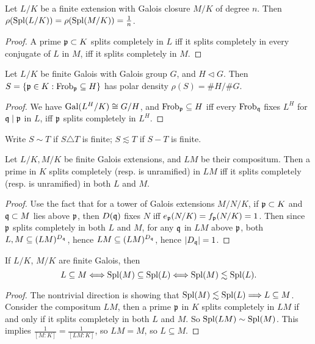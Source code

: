 \documentclass[11pt]{amsart}
\begin{document}
\begin{cor}
    Let $L/K$ be a finite extension with Galois closure $M/K$ of degree $n$. Then $\rho(\operatorname{Spl}(L/K)) = \rho(\operatorname{Spl}(M/K)) = \frac1n$.
\end{cor}

\begin{proof}
    A prime $\mathfrak{p}\subset K$ splits completely in $L$ iff it splits completely in every conjugate of $L$ in $M$, iff it splits completely in $M$.
\end{proof}

\begin{cor}
    Let $L/K$ be finite Galois with Galois group $G$, and $H\lhd G$. Then $S = \{\mathfrak{p}\in K: \operatorname{Frob}_{\mathfrak{p}} \subseteq H\}$ has polar density $\rho(S) = \#H/\#G$. 
\end{cor}

\begin{proof}
    We have $\operatorname{Gal}(L^H/K) \cong G/H$, and $\operatorname{Frob}_{\mathfrak{p}} \subseteq H$ iff every $\operatorname{Frob}_{\mathfrak{q}}$ fixes $L^H$ for $\mathfrak{q}\mid \mathfrak{p}$ in $L$, iff $\mathfrak{p}$ splits completely in $L^H$.
\end{proof}

Write $S\sim T$ if $S\triangle T$ is finite; $S\lesssim T$ if $S-T$ is finite.

\begin{lem}
    Let $L/K, M/K$ be finite Galois extensions, and $LM$ be their compositum. Then a prime in $K$ splits completely (resp. is unramified) in $LM$ iff it splits completely (resp. is unramified) in both $L$ and $M$.
\end{lem}

\begin{proof}
    Use the fact that for a tower of Galois extensions $M/N/K$, if $\mathfrak{p}\subset K$ and $\mathfrak{q}\subset M$ lies above $\mathfrak{p}$, then $D(\mathfrak{q})$ fixes $N$ iff $e_{\mathfrak{p}}(N/K) = f_{\mathfrak{p}}(N/K) = 1$. Then since $\mathfrak{p}$ splits completely in both $L$ and $M$, for any $\mathfrak{q}$ in $LM$ above $\mathfrak{p}$, both $L,M\subseteq (LM)^{D_{\mathfrak{q}}}$, hence $LM\subseteq (LM)^{D_{\mathfrak{q}}}$, hence $|D_{\mathfrak{q}}| = 1$.
\end{proof}

\begin{thm}
\label{two_galois_spl_equal}
    If $L/K$, $M/K$ are finite Galois, then 
    \[L\subseteq M \Longleftrightarrow \operatorname{Spl}(M)\subseteq \operatorname{Spl}(L) \Longleftrightarrow \operatorname{Spl}(M) \lesssim \operatorname{Spl}(L).\]
\end{thm}

\begin{proof}
    The nontrivial direction is showing that $\operatorname{Spl}(M)\lesssim \operatorname{Spl}(L) \Longrightarrow L\subseteq M$. Consider the compositum $LM$, then a prime $\mathfrak{p}$ in $K$ splits completely in $LM$ if and only if it splits completely in both $L$ and $M$. So $\operatorname{Spl}(LM)\sim \operatorname{Spl}(M)$. This implies $\frac{1}{[M:K]} = \frac{1}{[LM:K]}$, so $LM = M$, so $L\subseteq M$.
\end{proof}
\end{document}
